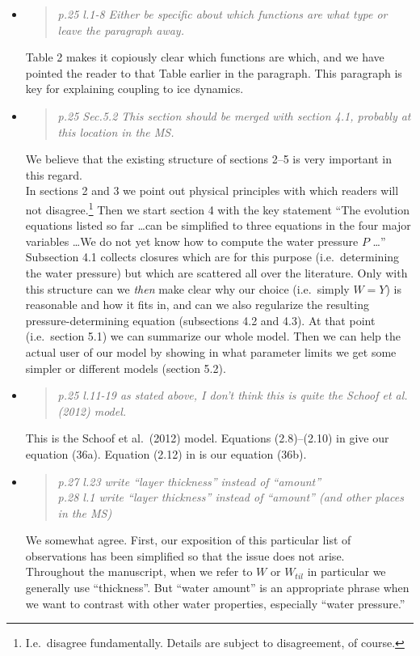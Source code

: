 \documentclass[11pt,reqno]{amsart}
\newcommand{\reply}[2]{
\medskip\medskip
\item  \begin{quote}
\emph{#1}
\end{quote}

\medskip
\noindent #2}
\begin{document}
\begin{itemize}
\reply{p.25 l.1-8 Either be specific about which functions are what type or leave the paragraph away.}
{Table 2 makes it copiously clear which functions are which, and we have pointed the reader to that Table earlier in the paragraph.  This paragraph is key for explaining coupling to ice dynamics.}

\reply{p.25 Sec.5.2 This section should be merged with section 4.1, probably at this location in the MS.}
{We believe that the existing structure of sections 2--5 is very important in this regard. \\
\indent In sections 2 and 3 we point out physical principles with which readers will not disagree.\footnote{I.e.~disagree fundamentally.  Details are subject to disagreement, of course.}  Then we start section 4 with the key statement ``The evolution equations listed so far \dots can be simplified to three equations in the four major variables \dots  We do not yet know how to compute the water pressure $P$ \dots''  Subsection 4.1 collects closures which are for this purpose (i.e.~determining the water pressure) but which are scattered all over the literature.  Only with this structure can we \emph{then} make clear why our choice (i.e.~simply $W=Y$) is reasonable and how it fits in, and can we also regularize the resulting pressure-determining equation (subsections 4.2 and 4.3).  At that point (i.e.~section 5.1) we can summarize our whole model.  Then we can help the actual user of our model by showing in what parameter limits we get some simpler or different models (section 5.2).}

\reply{p.25 l.11-19 as stated above, I don’t think this is quite the Schoof et al. (2012) model.}
{This is the Schoof et al.~(2012) \cite{Schoofetal2012} model.  Equations (2.8)--(2.10) in \cite{Schoofetal2012} give our equation (36a).  Equation (2.12) in \cite{Schoofetal2012} is our equation (36b).}

\reply{p.27 l.23 write ``layer thickness'' instead of ``amount''\\
\indent p.28 l.1 write ``layer thickness'' instead of ``amount'' (and other places in the MS)}
{We somewhat agree.  First, our exposition of this particular list of observations has been simplified so that the issue does not arise.  \\
\indent Throughout the manuscript, when we refer to $W$ or $W_{til}$ in particular we generally use ``thickness''.  But ``water amount'' is an appropriate phrase when we want to contrast with other water properties, especially ``water pressure.''}


\end{itemize}
\end{document}
